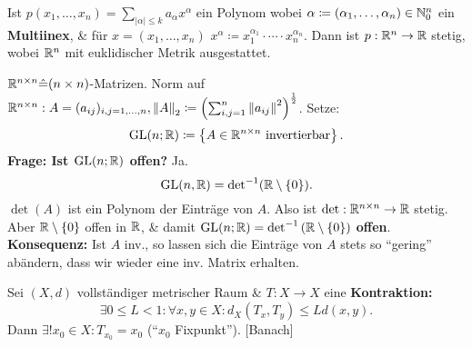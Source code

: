 \begin{subexample}
	Ist $ p(x_1, \dotsc, x_n) = \sum_{\left| \alpha \right| \leq k}^{} a_{\alpha} x^{\alpha} $ ein Polynom wobei $ \alpha \coloneqq (\alpha_1, \dotsc, \alpha_n) \in \mathbb{N} _0^n $ ein \textbf{Multiinex}, \& für $ x = (x_1, \dotsc, x_n) $ $ x^\alpha \coloneqq x_1^{\alpha_1} \cdot \dotsb \cdot x_n^{\alpha_n}  $. Dann ist $ p: \mathbb{R} ^n \to \mathbb{R}  $ stetig, wobei $ \mathbb{R} ^n $ mit euklidischer Metrik ausgestattet.
\end{subexample}

\begin{subexample}
	$ \mathbb{R} ^{n \times n} \hat{=} (n \times n) $-Matrizen. Norm auf $ \mathbb{R} ^{n \times n} : A= (a_{ij} )_{i, j = 1, \dotsc, n} , \left\| A \right\| _2 \coloneqq \left( \sum_{i, j=1}^{n} \left\| a_{ij} \right\|^2  \right) ^{\frac{ 1 }{ 2 } }  $. Setze:
	\[
		\operatorname{GL}(n;\mathbb{R} ) \coloneqq \left\{ A \in \mathbb{R} ^{n \times n} \text{ invertierbar}  \right\} .
	\]
	\textbf{Frage: Ist $ \operatorname{GL}(n;\mathbb{R} ) $ offen?} Ja.
	\[
		\operatorname{GL}(n, \mathbb{R} ) = \operatorname{det}^{-1}  (\mathbb{R} \setminus \left\{ 0 \right\} ).
	\]
	$ \det(A) $ ist ein Polynom der Einträge von $ A $. Also ist $ \det: \mathbb{R} ^{n \times n} \to \mathbb{R}  $ stetig.
	Aber $ \mathbb{R} \setminus \left\{ 0 \right\}  $ offen in $ \mathbb{R}  $, \& damit $ \operatorname{GL}(n;\mathbb{R} ) = \det ^{-1} \left( \mathbb{R} \setminus \left\{ 0 \right\}  \right)  $ \textbf{offen}.\\
	\textbf{Konsequenz:} Ist $ A $ inv., so lassen sich die Einträge von $ A $ stets so ``gering'' abändern, dass wir wieder eine inv. Matrix erhalten.
\end{subexample}

\begin{subtheorem}
	Sei $ (X, d) $ vollständiger metrischer Raum \& $ T: X \to X $ eine \textbf{Kontraktion:}
	\[
		\exists 0 \leq L < 1 : \forall x, y \in X : d_X(T_x, T_y) \leq L d(x, y).
	\]
	Dann $ \exists ! x_0 \in X : T_{x_0} = x_0 $ (``$ x_0 $ Fixpunkt''). [Banach]
\end{subtheorem}

